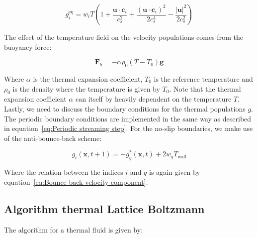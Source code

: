 \begin{equation}
    g^{\text{eq}}_i = w_i T \left(1 + \frac{\bm{u} \cdot \bm{c}_i}{c_s^2} + \frac{{\left(\bm{u} \cdot \bm{c}_i\right)}^2}{2c_s^4} - \frac{|\bm{u}|^2}{2c_s^2}\right)
\end{equation}

The effect of the temperature field on the velocity populations comes from the buoyancy force:

\begin{equation}\label{eq:Buoyancy force}
    \bm{F}_b = -\alpha \rho_0 \left(T - T_0\right)\bm{g}
\end{equation}

Where $\alpha$ is the thermal expansion coefficient, $T_0$ is the reference temperature and $\rho_0$ is the density where the temperature is given by $T_0$. Note that the thermal expansion coefficient $\alpha$ can itself by heavily dependent on the temperature $T$. Lastly, we need to discuss the boundary conditions for the thermal populations $g$. The periodic boundary conditions are implemented in the same way as described in equation~\ref{eq:Periodic streaming step}. For the no-slip boundaries, we make use of the anti-bounce-back scheme:

\begin{equation}\label{eq:Streaming anti-bounce-back}
    g_i(\bm{x}, t+1) = -g^\ast_q(\bm{x}, t) + 2 w_q T_{\text{wall}}
\end{equation}

Where the relation between the indices $i$ and $q$ is again given by equation~\ref{eq:Bounce-back velocity component}. 

\subsection{Algorithm thermal Lattice Boltzmann}
The algorithm for a thermal fluid is given by:

